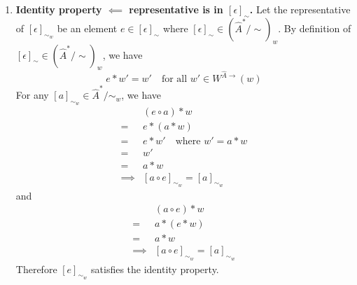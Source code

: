 \begin{proofE}
\begin{enumerate}
    For \cref{eqn:identity_property_of_e_2}, we have
    \begin{align}
        & (e \circ a) \ast w = a \ast w \quad \text{for all $a \in \hat{A}^{*}$} \\
        \implies & e \ast (a \ast w) = a \ast w \quad \text{for all $a \in \hat{A}^{*}$} \\
        \implies & e \ast w' = w' \quad \textit{where $a \ast w = w'$} \quad \text{for all $a \in \hat{A}^{*}$}
    \end{align}
    Since this must hold for all $a \in \hat{A}^{*}$, $w'$ can be any world state that is reachable from $w$ (i.e., $w' \in W^{\hat{A}\to}(w)$).
    This gives us\footnote{Note that this condition includes \cref{eqn:identity_condition_e_1}.}
    \begin{equation}\label{eqn:identity_condition_e_2}
        e \ast w' = w' \quad \text{for all $w' \in W^{\hat{A}\to}(w)$}
    \end{equation}
    Since $\epsilon$ satisfies $\epsilon \ast w = w$ for all $w \in W$, \cref{eqn:identity_condition_e_2} is the definition for $e$ being an element of $[\epsilon]_{\sim} \in (\hat{A}^{*}/\sim)_{w}$.
    
   \item \textbf{Identity property $\impliedby$ representative is in $[\epsilon]_{\sim}$.}
   Let the representative of $[\epsilon]_{\sim_{w}}$ be an element $e \in [\epsilon]_{\sim}$ where $[\epsilon]_{\sim} \in (\hat{A}^{*}/\sim)_{w}$.
   By definition of $[\epsilon]_{\sim} \in (\hat{A}^{*}/\sim)_{w}$, we have
   \begin{equation}
       e \ast w' = w' \quad \text{for all $w' \in W^{\hat{A}\to}(w)$}
   \end{equation}
   For any $[a]_{\sim_{w}} \in \hat{A}^{*}/\sim_{w}$, we have
   \begin{align}
       & (e \circ a) \ast w \\
       = & e \ast (a \ast w) \\
       = & e \ast w' \quad \text{where $w' = a \ast w$} \\
       = & w' \\
       = & a \ast w \\
       \implies & [a \circ e]_{\sim_{w}} = [a]_{\sim_{w}}
   \end{align}
   and
   \begin{align}
       & (a \circ e) \ast w \\
       = & a \ast (e \ast w) \\
       = & a \ast w \\
       \implies & [a \circ e]_{\sim_{w}} = [a]_{\sim_{w}}
   \end{align}
    Therefore $[e]_{\sim_{w}}$ satisfies the identity property.
\end{enumerate}
\end{proofE}

